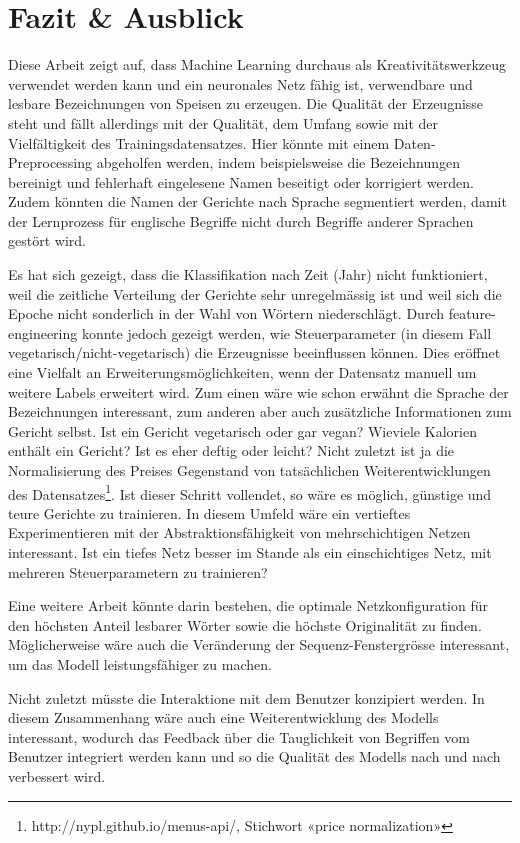 \chapter{Fazit \& Ausblick}
\label{ch:conclusions}

Diese Arbeit zeigt auf, dass Machine Learning durchaus als Kreativitätswerkzeug verwendet werden kann und ein
neuronales Netz fähig ist, verwendbare und lesbare Bezeichnungen von Speisen zu erzeugen.
Die Qualität der Erzeugnisse steht und fällt allerdings mit der Qualität, dem Umfang sowie mit der Vielfältigkeit des Trainingsdatensatzes.
Hier könnte mit einem Daten-Preprocessing abgeholfen werden, indem beispielsweise die Bezeichnungen bereinigt und fehlerhaft eingelesene Namen beseitigt oder korrigiert werden.
Zudem könnten die Namen der Gerichte nach Sprache segmentiert werden, damit der Lernprozess für englische Begriffe nicht durch Begriffe anderer Sprachen gestört wird.

Es hat sich gezeigt, dass die Klassifikation nach Zeit (Jahr) nicht funktioniert, weil die zeitliche Verteilung der Gerichte sehr unregelmässig ist und weil sich die Epoche nicht sonderlich in der Wahl von Wörtern niederschlägt.
Durch \gls{feature-engineering} konnte jedoch gezeigt werden, wie Steuerparameter (in diesem Fall vegetarisch/nicht-vegetarisch) die Erzeugnisse beeinflussen können.
Dies eröffnet eine Vielfalt an Erweiterungsmöglichkeiten, wenn der Datensatz manuell um weitere Labels erweitert wird.
Zum einen wäre wie schon erwähnt die Sprache der Bezeichnungen interessant, zum anderen aber auch zusätzliche Informationen zum Gericht selbst.
Ist ein Gericht vegetarisch oder gar vegan?
Wieviele Kalorien enthält ein Gericht?
Ist es eher deftig oder leicht?
Nicht zuletzt ist ja die Normalisierung des Preises Gegenstand von tatsächlichen Weiterentwicklungen des Datensatzes\footnote{http://nypl.github.io/menus-api/, Stichwort «price normalization»}.
Ist dieser Schritt vollendet, so wäre es möglich, günstige und teure Gerichte zu trainieren.
In diesem Umfeld wäre ein vertieftes Experimentieren mit der Abstraktionsfähigkeit von mehrschichtigen Netzen interessant.
Ist ein tiefes Netz besser im Stande als ein einschichtiges Netz, mit mehreren Steuerparametern zu trainieren?

Eine weitere Arbeit könnte darin bestehen, die optimale Netzkonfiguration für den höchsten Anteil lesbarer Wörter sowie die höchste Originalität zu finden.
Möglicherweise wäre auch die Veränderung der Sequenz-Fenstergrösse interessant, um das Modell leistungsfähiger zu machen.

Nicht zuletzt müsste die Interaktione mit dem Benutzer konzipiert werden.
In diesem Zusammenhang wäre auch eine Weiterentwicklung des Modells interessant, wodurch das Feedback über die Tauglichkeit von Begriffen vom Benutzer integriert werden kann und so die Qualität des Modells nach und nach verbessert wird.
